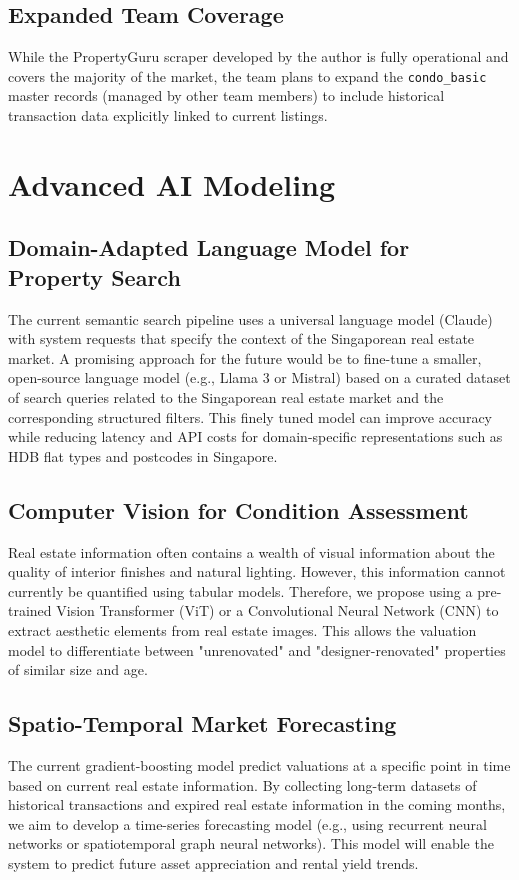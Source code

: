 \subsection{Expanded Team Coverage}
While the PropertyGuru scraper developed by the author is fully operational and covers the majority of the market, the team plans to expand the \texttt{condo\_basic} master records (managed by other team members) to include historical transaction data explicitly linked to current listings.

\section{Advanced AI Modeling}

\subsection{Domain-Adapted Language Model for Property Search}
The current semantic search pipeline uses a universal language model (Claude) with system requests that specify the context of the Singaporean real estate market. A promising approach for the future would be to fine-tune a smaller, open-source language model (e.g., Llama 3 or Mistral) based on a curated dataset of search queries related to the Singaporean real estate market and the corresponding structured filters. This finely tuned model can improve accuracy while reducing latency and API costs for domain-specific representations such as HDB flat types and postcodes in Singapore.

\subsection{Computer Vision for Condition Assessment}
Real estate information often contains a wealth of visual information about the quality of interior finishes and natural lighting. However, this information cannot currently be quantified using tabular models. Therefore, we propose using a pre-trained Vision Transformer (ViT) or a Convolutional Neural Network (CNN) to extract aesthetic elements from real estate images. This allows the valuation model to differentiate between "unrenovated" and "designer-renovated" properties of similar size and age.

\subsection{Spatio-Temporal Market Forecasting}
The current gradient-boosting model predict valuations at a specific point in time based on current real estate information. By collecting long-term datasets of historical transactions and expired real estate information in the coming months, we aim to develop a time-series forecasting model (e.g., using recurrent neural networks or spatiotemporal graph neural networks). This model will enable the system to predict future asset appreciation and rental yield trends.

